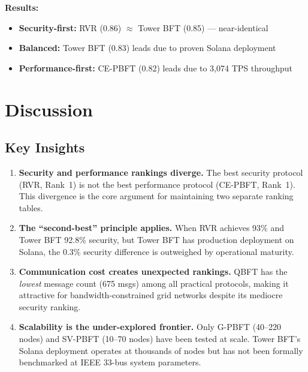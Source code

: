 \documentclass[10pt,twocolumn,letterpaper]{article}
\begin{document}
\textbf{Results:}
\begin{itemize}[leftmargin=*]
    \item \textbf{Security-first:} RVR (0.86) $\approx$ Tower BFT (0.85) --- near-identical
    \item \textbf{Balanced:} Tower BFT (0.83) leads due to proven Solana deployment
    \item \textbf{Performance-first:} CE-PBFT (0.82) leads due to 3,074 TPS throughput
\end{itemize}

\section{Discussion}
\label{sec:discussion}

\subsection{Key Insights}

\begin{enumerate}[leftmargin=*]
    \item \textbf{Security and performance rankings diverge.} The best security protocol (RVR, Rank~1) is not the best performance protocol (CE-PBFT, Rank~1). This divergence is the core argument for maintaining two separate ranking tables.

    \item \textbf{The ``second-best'' principle applies.} When RVR achieves 93\% and Tower BFT 92.8\% security, but Tower BFT has production deployment on Solana, the 0.3\% security difference is outweighed by operational maturity.

    \item \textbf{Communication cost creates unexpected rankings.} QBFT has the \emph{lowest} message count (675 msgs) among all practical protocols, making it attractive for bandwidth-constrained grid networks despite its mediocre security ranking.

    \item \textbf{Scalability is the under-explored frontier.} Only G-PBFT (40--220 nodes) and SV-PBFT (10--70 nodes) have been tested at scale. Tower BFT's Solana deployment operates at thousands of nodes but has not been formally benchmarked at IEEE 33-bus system parameters.
\end{enumerate}
\end{document}
